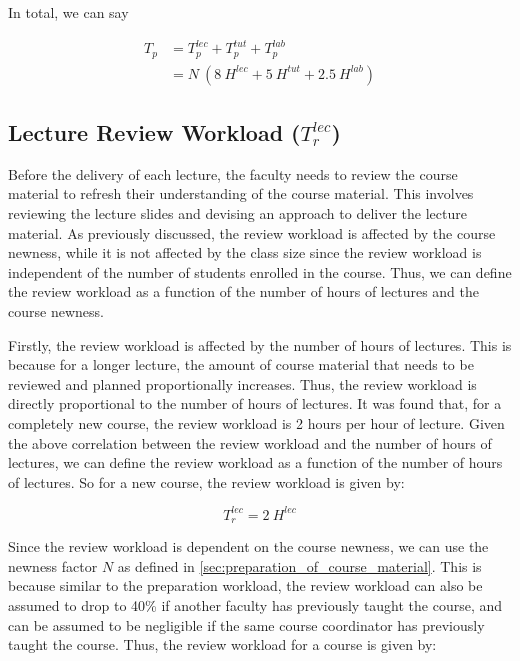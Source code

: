 In total, we can say

\begin{equation}
  \label{eqn:preparation-workload-total}
  \begin{aligned}
    T_p & = T_p^{lec} + T_p^{tut} + T_p^{lab}           \\
        & = N\ (8\ H^{lec} + 5\ H^{tut} + 2.5\ H^{lab})
  \end{aligned}
\end{equation}

\subsection{Lecture Review Workload (\(T_r^{lec}\))}

Before the delivery of each lecture, the faculty needs to review the course material to refresh their understanding of the course material. This involves reviewing the lecture slides and devising an approach to deliver the lecture material. As previously discussed, the review workload is affected by the course newness, while it is not affected by the class size since the review workload is independent of the number of students enrolled in the course. Thus, we can define the review workload as a function of the number of hours of lectures and the course newness.

Firstly, the review workload is affected by the number of hours of lectures. This is because for a longer lecture, the amount of course material that needs to be reviewed and planned proportionally increases. Thus, the review workload is directly proportional to the number of hours of lectures. It was found that, for a completely new course, the review workload is 2 hours per hour of lecture. Given the above correlation between the review workload and the number of hours of lectures, we can define the review workload as a function of the number of hours of lectures. So for a new course, the review workload is given by:

\begin{equation*}
  \label{eqn:review-workload}
  T_r^{lec} = 2\ H^{lec}
\end{equation*}

Since the review workload is dependent on the course newness, we can use the newness factor \(N\) as defined in \autoref{sec:preparation_of_course_material}. This is because similar to the preparation workload, the review workload can also be assumed  to drop to 40\% if another faculty has previously taught the course, and can be assumed to be negligible if the same course coordinator has previously taught the course. Thus, the review workload for a course is given by:

